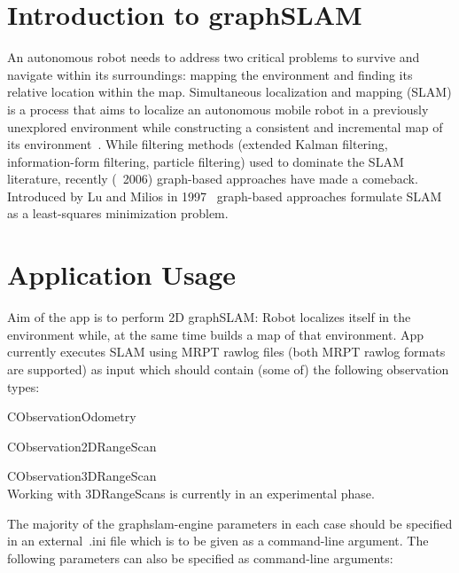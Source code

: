 \section{Introduction to graphSLAM}
An autonomous robot needs to address two critical problems to survive and
navigate within its surroundings: mapping the environment and finding its
relative location within the map. Simultaneous localization and mapping
(SLAM) is a process that aims to localize an autonomous mobile robot in a
previously unexplored environment while constructing a consistent and
incremental map of its environment~\cite{Saeedi2016}.
While filtering methods (extended Kalman filtering, information-form
filtering, particle filtering) used to dominate the SLAM literature, recently
(~2006) graph-based approaches have made a comeback. Introduced by Lu and
Milios in 1997~\cite{Lu1994} graph-based approaches formulate SLAM as a least-squares
minimization problem.

\section{Application Usage}

Aim of the app is to perform 2D graphSLAM: Robot localizes itself in the
environment while, at the same time builds a map of that environment. App
currently executes SLAM using MRPT rawlog files (both MRPT rawlog formats are
supported) as input which should contain (some of) the following observation
types:

\begin{itemize*}
    \item CObservationOdometry
    \item CObservation2DRangeScan
    \item CObservation3DRangeScan\hfill\\
        Working with 3DRangeScans is currently in an experimental phase.
\end{itemize*}

The majority of the graphslam-engine parameters in each case should be
specified in an external~.ini file which is to be given as a command-line
argument. The following parameters can also be specified as command-line
arguments:

